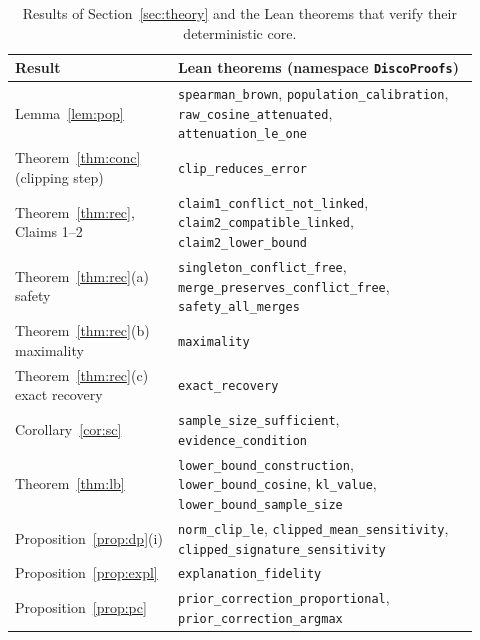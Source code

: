 \begin{table}[h]
\centering
\caption{Results of Section~\ref{sec:theory} and the Lean theorems that verify their deterministic core.}\label{tab:lean}
\small
\begin{tabular}{p{0.3\linewidth}>{\raggedright\arraybackslash}p{0.62\linewidth}}
\toprule
Result & Lean theorems (namespace \texttt{DiscoProofs}) \\
\midrule
Lemma~\ref{lem:pop} & \texttt{spearman\_brown}, \texttt{population\_calibration}, \texttt{raw\_cosine\_attenuated}, \texttt{attenuation\_le\_one} \\
Theorem~\ref{thm:conc} (clipping step) & \texttt{clip\_reduces\_error} \\
Theorem~\ref{thm:rec}, Claims 1--2 & \texttt{claim1\_conflict\_not\_linked}, \texttt{claim2\_compatible\_linked}, \texttt{claim2\_lower\_bound} \\
Theorem~\ref{thm:rec}(a) safety & \texttt{singleton\_conflict\_free}, \texttt{merge\_preserves\_conflict\_free}, \texttt{safety\_all\_merges} \\
Theorem~\ref{thm:rec}(b) maximality & \texttt{maximality} \\
Theorem~\ref{thm:rec}(c) exact recovery & \texttt{exact\_recovery} \\
Corollary~\ref{cor:sc} & \texttt{sample\_size\_sufficient}, \texttt{evidence\_condition} \\
Theorem~\ref{thm:lb} & \texttt{lower\_bound\_construction}, \texttt{lower\_bound\_cosine}, \texttt{kl\_value}, \texttt{lower\_bound\_sample\_size} \\
Proposition~\ref{prop:dp}(i) & \texttt{norm\_clip\_le}, \texttt{clipped\_mean\_sensitivity}, \texttt{clipped\_signature\_sensitivity} \\
Proposition~\ref{prop:expl} & \texttt{explanation\_fidelity} \\
Proposition~\ref{prop:pc} & \texttt{prior\_correction\_proportional}, \texttt{prior\_correction\_argmax} \\
\bottomrule
\end{tabular}
\end{table}

